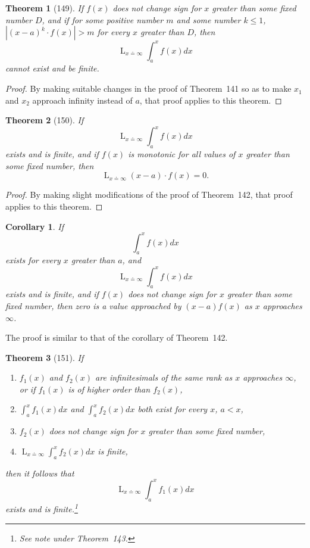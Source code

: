\documentclass[a4paper,12pt]{book}[2004/02/16]
\providecommand{\leqq}{\leq}
\providecommand{\colorbox}[2]{#2}
\newcommand{\correction}[2]{\colorbox{corr}{#1}}
\providecommand{\hyperlink}[2]{#2}
\providecommand{\hypertarget}[2]{#2}
\theoremstyle{ilemma}
\theoremstyle{itheorem}
\newtheorem{theorem}{Theorem}
\theoremstyle{iother}
\theoremstyle{icorollary}
\newtheorem{corollary}{Corollary}
\theoremstyle{numcorollary}
\theoremstyle{idefinition}
\begin{document}
\begin{theorem}[149]\hypertarget{thm149}{}
If $f(x)$ does not change sign for $x$ greater than
some fixed number $D$, and if for some positive number $m$ and
some number $ k\leqq 1$\correction{,}{} $\left|(x-a)^k\cdot f(x)\right|>m$ for every $x$ greater than $D$,
then
\[
  \mathop{L}_{x\doteq \infty}\int_a^xf(x)dx
\]
cannot exist and be finite.
\end{theorem}

\begin{proof}
By making suitable changes in the proof of Theorem~\hyperlink{thm141}{141} so as to make
$x_1$ and $x_2$ approach infinity instead of $a$, that proof applies
to this theorem.
\end{proof}

\begin{theorem}[150]\hypertarget{thm150}{}
If
\[
  \mathop{L}_{x\doteq \infty}\int_a^xf(x)dx
\]
exists and is finite, and if $f(x)$ is monotonic for all values of $x$
greater than some fixed number, then
\[
  \mathop{L}_{x\doteq \infty}(x-a)\cdot f(x)=0.
\]
\end{theorem}

\begin{proof}
By making slight modifications of the proof of Theorem~\hyperlink{thm142}{142}, that proof
applies to this theorem.
\end{proof}

\begin{corollary}
If
\[
  \int_a^xf(x)dx
\]
exists for every $x$ greater than $a$, and
\[
  \mathop{L}_{x\doteq \infty}\int_a^xf(x)dx
\]
exists and is finite, and if $f(x)$ does not change sign for $x$
greater
than some fixed number, then zero is a value approached by $(x-a)f(x)$
as $x$ approaches $\infty$.
\end{corollary}
The proof is similar to that of the corollary of Theorem~\hyperlink{thm142}{142}.


\begin{theorem}[151]\hypertarget{thm151}{}
If
\begin{enumerate}
\item[\textnormal{(1)}] $f_1(x)$ and $f_2(x)$ are infinitesimals of the same rank
as $x$ approaches $\infty$, or if $f_1(x)$ is of higher order than
$f_2(x)$,

\item[\textnormal{(2)}] $\displaystyle \int_a^xf_1(x)dx$ and $\displaystyle
\int_a^xf_2(x)dx$ both exist for every $x$, $a<x$,

\item[\textnormal{(3)}] $f_2(x)$ does not change sign for $x$ greater than some
fixed number,

\item[\textnormal{(4)}] $\displaystyle \mathop{L}_{x\doteq \infty}\int_a^xf_2(x)dx$
is finite,
\end{enumerate}
then it follows that
\[
  \mathop{L}_{x\doteq \infty}\int_a^xf_1(x)dx
\]
exists and is finite.\footnote{%
  See note under Theorem~\hyperlink{thm143}{143}.}
\end{theorem}
\end{document}
